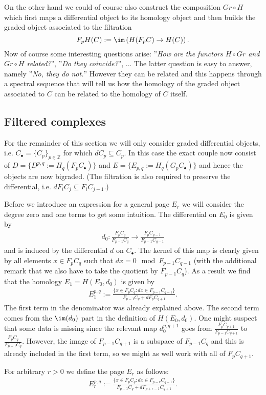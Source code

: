 	On the other hand we could of course also construct the composition $Gr\circ H$ which first maps a differential object to its homology object and then builds the graded object associated to the filtration \[F_pH(C):=\im\left(H(F_pC)\rightarrow H(C)\right).\] Now of course some interesting questions arise: ''\textit{How are the functors $H\circ Gr$ and $Gr\circ H$ related?}'', ''\textit{Do they coincide?}'', ... The latter question is easy to answer, namely ''\textit{No, they do not.}'' However they can be related and this happens through a spectral sequence that will tell us how the homology of the graded object associated to $C$ can be related to the homology of $C$ itself.

\subsection{Filtered complexes}

	For the remainder of this section we will only consider graded differential objects, i.e. $C_\bullet=\{C_p\}_{p\in\mathbb{Z}}$ for which $dC_p\subseteq C_p$. In this case the exact couple now consist of $D=\{D^{p,q}:=H_q(F_pC_\bullet)\}$ and $E=\{E_{p,q}:=H_q(G_pC_\bullet)\}$ and hence the objects are now bigraded. (The filtration is also required to preserve the differential, i.e. $dF_iC_j\subseteq F_iC_{j-1}$.)


	Before we introduce an expression for a general page $E_r$ we will consider the degree zero and one terms to get some intuition. The differential on $E_0$ is given by
	\begin{gather}
		d_0:\frac{F_pC_q}{F_{p-1}C_q}\rightarrow\frac{F_pC_{q-1}}{F_{p-1}C_{q-1}}
	\end{gather}
	and is induced by the differential $d$ on $C_\bullet$. The kernel of this map is clearly given by all elements $x\in F_pC_q$ such that $dx = 0\mod F_{p-1}C_{q-1}$ (with the additional remark that we also have to take the quotient by $F_{p-1}C_q$). As a result we find that the homology $E_1=H(E_0, d_0)$ is given by
	\begin{gather}
		E_1^{p,q}:=\frac{\{x\in F_pC_q: dx\in F_{p-1}C_{q-1}\}}{F_{p-1}C_q+dF_pC_{q+1}}.
	\end{gather}
	The first term in the denominator was already explained above. The second term comes from the $\im(d_0)$ part in the definition of $H(E_0, d_0)$. One might suspect that some data is missing since the relevant map $d_0^{p, q+1}$ goes from $\frac{F_pC_{q+1}}{F_{p-1}C_{q+1}}$ to $\frac{F_pC_q}{F_{p-1}C_{q}}$. However, the image of $F_{p-1}C_{q+1}$ is a subspace of $F_{p-1}C_q$ and this is already included in the first term, so we might as well work with all of $F_pC_{q+1}$.

	For arbitrary $r>0$ we define the page $E_r$ as follows:
	\begin{gather}
	E_r^{p,q}:=\frac{\{x\in F_pC_q: dx\in F_{p-r}C_{q-1}\}}{F_{p-1}C_q+dF_{p+r-1}C_{q+1}}.
	\end{gather}
